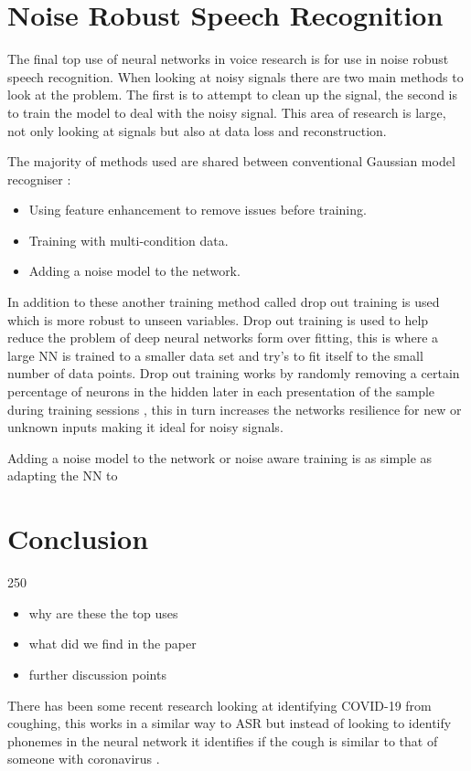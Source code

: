 \documentclass[11pt]{article}
\begin{document}
    \section{Noise Robust Speech Recognition}
    The final top use of neural networks in voice research is for use in noise robust speech recognition. When looking at noisy signals there are two main methods to look at the problem. The first is to attempt to clean up the signal, the second is to train the model to deal with the noisy signal. This area of research is large, not only looking at signals but also at data loss and reconstruction.
    
    The majority of methods used are shared between conventional Gaussian model recogniser \cite{Seltzer2013AnRecognition}:
    \begin{itemize}
        \item Using feature enhancement to remove issues before training.
        \item Training with multi-condition data.
        \item Adding a noise model to the network.
    \end{itemize}
    
    In addition to these another training method called drop out training is used which is more robust to unseen variables. Drop out training is used to help reduce the problem of deep neural networks form over fitting, this is where a large NN is trained to a smaller data set and try's to fit itself to the small number of data points. Drop out training works by randomly removing a certain percentage of neurons in the hidden later in each presentation of the sample during training sessions \cite{Hinton2012ImprovingDetectors}, this in turn increases the networks resilience for new or unknown inputs making it ideal for noisy signals. 
    
    Adding a noise model to the network or noise aware training is as simple as adapting the NN to 
    \section{Conclusion}
    250
    \begin{itemize}
        \item why are these the top uses
        \item what did we find in the paper
        \item further discussion points
    \end{itemize}
    
    There has been some recent research looking at identifying COVID-19 from coughing, this works in a similar way to ASR but instead of looking to identify phonemes in the neural network it identifies if the cough is similar to that of someone with coronavirus \cite{Laguarta2020COVID-19Recordings}. 


\pagebreak

\printbibliography
\end{document}
